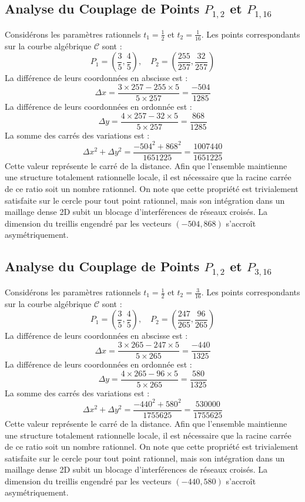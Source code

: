 \documentclass[12pt, a4paper]{article}
\begin{document}
\subsection{Analyse du Couplage de Points $P_{1,2}$ et $P_{1,16}$}
Considérons les paramètres rationnels $t_1 = \frac{1}{2}$ et $t_2 = \frac{1}{16}$.
Les points correspondants sur la courbe algébrique $\mathcal{C}$ sont :
$$ P_1 = \left( \frac{3}{5}, \frac{4}{5} \right), \quad P_2 = \left( \frac{255}{257}, \frac{32}{257} \right) $$
La différence de leurs coordonnées en abscisse est :
$$ \Delta x = \frac{3 \times 257 - 255 \times 5}{5 \times 257} = \frac{-504}{1285} $$
La différence de leurs coordonnées en ordonnée est :
$$ \Delta y = \frac{4 \times 257 - 32 \times 5}{5 \times 257} = \frac{868}{1285} $$
La somme des carrés des variations est :
$$ \Delta x^2 + \Delta y^2 = \frac{ -504^2 + 868^2 }{ 1651225 } = \frac{ 1007440 }{ 1651225 } $$
Cette valeur représente le carré de la distance. Afin que l'ensemble maintienne une structure totalement rationnelle locale, il est nécessaire que la racine carrée de ce ratio soit un nombre rationnel. On note que cette propriété est trivialement satisfaite sur le cercle pour tout point rationnel, mais son intégration dans un maillage dense 2D subit un blocage d'interférences de réseaux croisés. La dimension du treillis engendré par les vecteurs $( -504, 868 )$ s'accroît asymétriquement.


\subsection{Analyse du Couplage de Points $P_{1,2}$ et $P_{3,16}$}
Considérons les paramètres rationnels $t_1 = \frac{1}{2}$ et $t_2 = \frac{3}{16}$.
Les points correspondants sur la courbe algébrique $\mathcal{C}$ sont :
$$ P_1 = \left( \frac{3}{5}, \frac{4}{5} \right), \quad P_2 = \left( \frac{247}{265}, \frac{96}{265} \right) $$
La différence de leurs coordonnées en abscisse est :
$$ \Delta x = \frac{3 \times 265 - 247 \times 5}{5 \times 265} = \frac{-440}{1325} $$
La différence de leurs coordonnées en ordonnée est :
$$ \Delta y = \frac{4 \times 265 - 96 \times 5}{5 \times 265} = \frac{580}{1325} $$
La somme des carrés des variations est :
$$ \Delta x^2 + \Delta y^2 = \frac{ -440^2 + 580^2 }{ 1755625 } = \frac{ 530000 }{ 1755625 } $$
Cette valeur représente le carré de la distance. Afin que l'ensemble maintienne une structure totalement rationnelle locale, il est nécessaire que la racine carrée de ce ratio soit un nombre rationnel. On note que cette propriété est trivialement satisfaite sur le cercle pour tout point rationnel, mais son intégration dans un maillage dense 2D subit un blocage d'interférences de réseaux croisés. La dimension du treillis engendré par les vecteurs $( -440, 580 )$ s'accroît asymétriquement.
\end{document}
